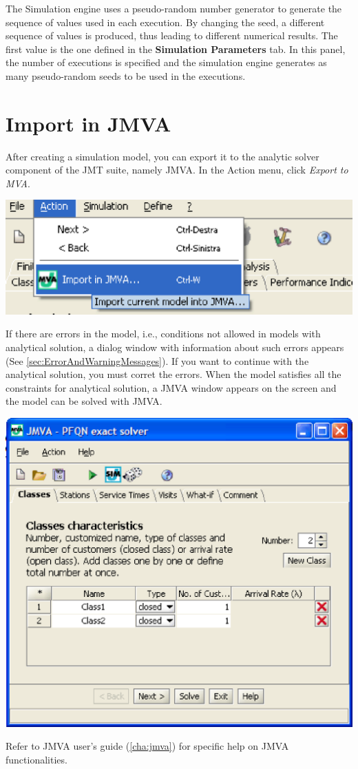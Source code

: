 \begin{description*}
The Simulation engine uses a pseudo-random number generator to generate the sequence of values used in each execution. By changing the seed, a different sequence of values is produced, thus leading to different numerical results. The first value is the one defined in the \textbf{Simulation Parameters} tab. In this panel, the number of executions is specified and the simulation engine generates as many pseudo-random seeds to be used in the executions.

\section{Import in JMVA}
\label{sec:importInJMVA}
After creating a simulation model, you can export it to the analytic solver component of the JMT suite, namely JMVA. In the Action menu, click \emph{Export to MVA}.
\begin{center}
\includegraphics[scale=.5]{img/jsim/import_to_JMVA.eps}
\end{center}
If there are errors in the model, i.e., conditions not allowed in models with analytical solution, a dialog window with information about such errors appears (See \autoref{sec:ErrorAndWarningMessages}). If you want to continue with the analytical solution, you must corret the errors.
When the model satisfies all the constraints for analytical solution, a JMVA window appears on the screen and the model can be solved with JMVA.
\begin{center}
\includegraphics[scale=.5]{img/jsim/jmva.eps}
\end{center}
Refer to JMVA user's guide (\autoref{cha:jmva}) for specific help on JMVA functionalities.


\end{description*}
